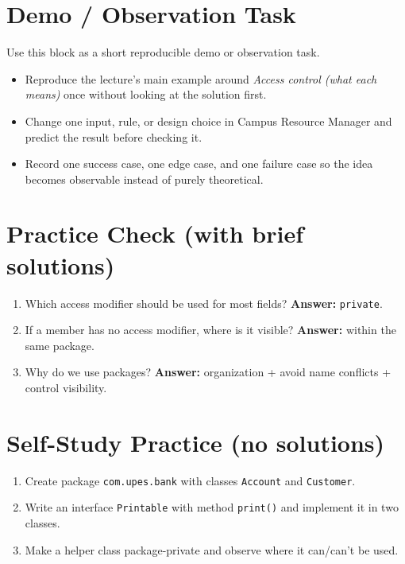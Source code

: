 \documentclass[11pt]{article}
\begin{document}
\section{Demo / Observation Task}
Use this block as a short reproducible demo or observation task.
\begin{itemize}
  \item Reproduce the lecture's main example around \textit{Access control (what each means)} once without looking at the solution first.
  \item Change one input, rule, or design choice in Campus Resource Manager and predict the result before checking it.
  \item Record one success case, one edge case, and one failure case so the idea becomes observable instead of purely theoretical.
\end{itemize}
\notesources{\OOPSUnitIISources}

\section{Practice Check (with brief solutions)}
\begin{enumerate}
  \item Which access modifier should be used for most fields?\; \textbf{Answer:} \texttt{private}.
  \item If a member has no access modifier, where is it visible?\; \textbf{Answer:} within the same package.
  \item Why do we use packages?\; \textbf{Answer:} organization + avoid name conflicts + control visibility.
\end{enumerate}

\section{Self-Study Practice (no solutions)}
\begin{enumerate}
  \item Create package \texttt{com.upes.bank} with classes \texttt{Account} and \texttt{Customer}.
  \item Write an interface \texttt{Printable} with method \texttt{print()} and implement it in two classes.
  \item Make a helper class package-private and observe where it can/can't be used.
\end{enumerate}
\end{document}
